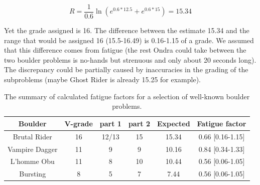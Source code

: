 \documentclass[11pt]{article}
\begin{document}
\begin{equation}
R = \frac{1}{0.6} \ln \left(e^{0.6 * 12.5} + e^{0.6*15}\right) = 15.34
\end{equation} 

Yet the grade assigned is 16. The difference between the estimate 15.34 and the range that would be assigned 16 (15.5-16.49)  is 0.16-1.15 of a grade. We assumed that this difference comes from fatigue (the rest Ondra could take between the two boulder problems is no-hands but strenuous and only about 20 seconds long). The discrepancy could be partially caused by inaccuracies in the grading of the subproblems (maybe Ghost Rider is already 15.25 for example).

\begin{table}
\centering
\begin{tabular}{| c | c | c | c | c | c |}
  \hline			
  {\bf Boulder } & {\bf V-grade} & {\bf part 1} & {\bf part 2} & {\bf Expected} & {\bf Fatigue factor } \\
  \hline			
  Brutal Rider & 16 & 12/13 & 15 & 15.34 & 0.66 [0.16-1.15]\\
  Vampire Dagger & 11 & 9 & 9 & 10.16 & 0.84 [0.34-1.33]\\
  L'homme Obu & 11 & 8 & 10 & 10.44 & 0.56 [0.06-1.05]\\
  Bursting & 8 & 5 & 7 & 7.44 & 0.56 [0.06-1.05]\\
  \hline  
\end{tabular}
\caption{The summary of calculated fatigue factors for a selection of well-known boulder problems. }
\label{table2}
\end{table}




\end{document}
